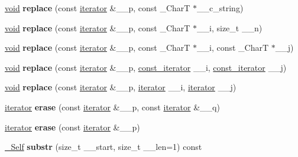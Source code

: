 \begin{DoxyCompactItemize}
\hyperlink{interfacevoid}{void} {\bfseries replace} (const \hyperlink{class___rope__iterator}{iterator} \&\+\_\+\+\_\+p, const \+\_\+\+CharT $\ast$\+\_\+\+\_\+c\+\_\+string)
\item 
\mbox{\label{classrope_afee8eabe6ca3b30b2ac9b8e0d9681898}} 
\hyperlink{interfacevoid}{void} {\bfseries replace} (const \hyperlink{class___rope__iterator}{iterator} \&\+\_\+\+\_\+p, const \+\_\+\+CharT $\ast$\+\_\+\+\_\+i, size\+\_\+t \+\_\+\+\_\+n)
\item 
\mbox{\label{classrope_a24309c1c45bea4b2cbdec93dfe8ee869}} 
\hyperlink{interfacevoid}{void} {\bfseries replace} (const \hyperlink{class___rope__iterator}{iterator} \&\+\_\+\+\_\+p, const \+\_\+\+CharT $\ast$\+\_\+\+\_\+i, const \+\_\+\+CharT $\ast$\+\_\+\+\_\+j)
\item 
\mbox{\label{classrope_a0b393b008bea1a0d32549ee804f9605c}} 
\hyperlink{interfacevoid}{void} {\bfseries replace} (const \hyperlink{class___rope__iterator}{iterator} \&\+\_\+\+\_\+p, \hyperlink{class___rope__const__iterator}{const\+\_\+iterator} \+\_\+\+\_\+i, \hyperlink{class___rope__const__iterator}{const\+\_\+iterator} \+\_\+\+\_\+j)
\item 
\mbox{\label{classrope_a07e9f5d1f70d84b46da28f61b9550f91}} 
\hyperlink{interfacevoid}{void} {\bfseries replace} (const \hyperlink{class___rope__iterator}{iterator} \&\+\_\+\+\_\+p, \hyperlink{class___rope__iterator}{iterator} \+\_\+\+\_\+i, \hyperlink{class___rope__iterator}{iterator} \+\_\+\+\_\+j)
\item 
\mbox{\label{classrope_a26b9ebdcdff2377dbfefba35327b3a84}} 
\hyperlink{class___rope__iterator}{iterator} {\bfseries erase} (const \hyperlink{class___rope__iterator}{iterator} \&\+\_\+\+\_\+p, const \hyperlink{class___rope__iterator}{iterator} \&\+\_\+\+\_\+q)
\item 
\mbox{\label{classrope_aa0284d2f3308fb054a4f3348f44efec7}} 
\hyperlink{class___rope__iterator}{iterator} {\bfseries erase} (const \hyperlink{class___rope__iterator}{iterator} \&\+\_\+\+\_\+p)
\item 
\mbox{\label{classrope_a63bc23bc5219d5fe32889eadc06e303f}} 
\hyperlink{classrope}{\+\_\+\+Self} {\bfseries substr} (size\+\_\+t \+\_\+\+\_\+start, size\+\_\+t \+\_\+\+\_\+len=1) const

\end{DoxyCompactItemize}
